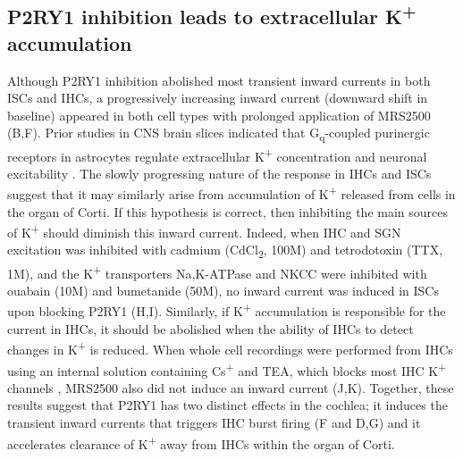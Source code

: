 \documentclass[9pt,lineno]{elife}
\begin{document}
\subsection{P2RY1 inhibition leads to extracellular K\textsuperscript{+} accumulation}
Although P2RY1 inhibition abolished most transient inward currents in both ISCs and IHCs, a progressively increasing inward current (downward shift in baseline) appeared in both cell types with prolonged application of MRS2500 (B,F). Prior studies in CNS brain slices indicated that  G\textsubscript{q}-coupled purinergic receptors in astrocytes regulate extracellular K\textsuperscript{+} concentration and neuronal excitability \citep{Wang2012}. The slowly progressing nature of the response in IHCs and ISCs suggest that it may similarly arise from accumulation of K\textsuperscript{+} released from cells in the organ of Corti. If this hypothesis is correct, then inhibiting the main sources of K\textsuperscript{+} should diminish this inward current. Indeed, when IHC and SGN excitation was inhibited with cadmium (CdCl\textsubscript{2}, 100\textmu M) and tetrodotoxin (TTX, 1\textmu M), and the K\textsuperscript{+} transporters Na,K-ATPase and NKCC were inhibited with ouabain (10\textmu M) and bumetanide (50\textmu M), no inward current was induced in ISCs upon blocking P2RY1 (H,I). Similarly, if K\textsuperscript{+} accumulation is responsible for the current in IHCs, it should be abolished when the ability of IHCs to detect changes in K\textsuperscript{+} is reduced. When whole cell recordings were performed from IHCs using an internal solution containing Cs\textsuperscript{+} and TEA, which blocks most IHC K\textsuperscript{+} channels \citep{kros1998expression,marcotti2003developmental}, MRS2500 also did not induce an inward current (J,K). Together, these results suggest that P2RY1 has two distinct effects in the cochlea; it induces the transient inward currents that triggers IHC burst firing (F and D,G) and it accelerates clearance of K\textsuperscript{+} away from IHCs within the organ of Corti.
\end{document}
